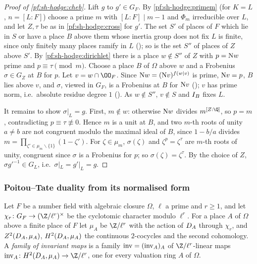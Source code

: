 \begin{proof}[Proof of \cref{pf:sh-hodge:cheb}]
Lift $g$ to $g'\in G_F$. By \cref{pf:sh-hodge:primem} (for $K=L$, $n=[L:F]$) choose a prime $m$ with $[L:F]\mid m-1$ and $\Phi_m$
irreducible over $L$, and let $Z,\tau$ be as in \cref{pf:sh-hodge:cross} for $g'$. The set $S'$ of places of $F$ which lie in $S$ or
have a place $B$ above them whose inertia group does not fix $L$ is finite, since only finitely many places ramify in $L$
(); so is the set $S''$ of places of $Z$ above $S'$. By
\cref{pf:sh-hodge:dirichlet} there is a place $w\notin S''$ of $Z$ with $p=\mathrm{N} w$ prime and $p\equiv\tau\pmod m$. Choose a place $B$
of $\Omega$ above $w$ and a Frobenius $\sigma\in G_Z$ at $B$ for $p$. Let $v=w\cap\OO_F$. Since $\mathrm{N} w=(\mathrm{N} v)^{f(w|v)}$ is
prime, $\mathrm{N} v=p$, $B$ lies above $v$, and $\sigma$, viewed in $G_F$, is a Frobenius at $B$ for $\mathrm{N} v$
(); $v$ has prime norm, i.e.\ absolute residue degree $1$
(). As $w\notin S''$, $v\notin S$ and
$I_B$ fixes $L$.

It remains to show $\sigma|_L=g$. First, $m\notin w$: otherwise $\mathrm{N} w$ divides $m^{[Z:\Q]}$, so $p=m$, contradicting
$p\equiv\tau\not\equiv0$. Hence $m$ is a unit at $B$, and two $m$-th roots of unity $a\ne b$ are not congruent modulo the maximal ideal of
$B$, since $1-b/a$ divides $m=\prod_{\zeta'\in\mu_m\smallsetminus\{1\}}(1-\zeta')$. For $\zeta\in\mu_m$, $\sigma(\zeta)$ and
$\zeta^p=\zeta^\tau$ are $m$-th roots of unity, congruent since $\sigma$ is a Frobenius for $p$; so $\sigma(\zeta)=\zeta^\tau$. By the
choice of $Z$, $\sigma g'^{-1}\in G_L$, i.e.\ $\sigma|_L=g'|_L=g$.
\end{proof}

\subsubsection{Poitou--Tate duality from its normalised form}

Let $F$ be a number field with algebraic closure $\Omega$, $\ell$ a prime and $r\ge1$, and let $\chi_r\colon G_F\to(\Z/\ell^r)^\times$
be the cyclotomic character modulo $\ell^r$. For a place $A$ of $\Omega$ above a finite place of $F$ let $\mu_{A}$ be
$\Z/\ell^r$ with the action of $D_A$ through $\chi_r$, and $Z^2(D_A,\mu_A)$, $H^2(D_A,\mu_A)$ the
continuous $2$-cocycles and the second cohomology. A \emph{family of invariant maps} is a family $\operatorname{inv}=(\operatorname{inv}_A)_A$
of $\Z/\ell^r$-linear maps $\shhodgeinv_A\colon H^2(\shhodgeDec_A,\mu_A)\to\Z/\ell^r$, one for every valuation ring $A$ of $\Omega$.

